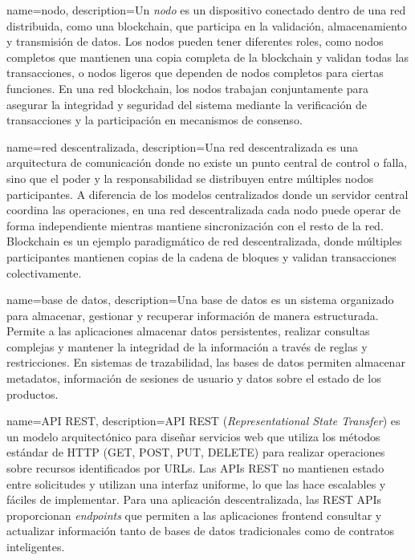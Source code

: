 {
    name=nodo,
    description={Un \textit{nodo} es un dispositivo conectado dentro de una red distribuida, como una blockchain, que participa en la validación, almacenamiento y transmisión de datos. Los nodos pueden tener diferentes roles, como nodos completos que mantienen una copia completa de la blockchain y validan todas las transacciones, o nodos ligeros que dependen de nodos completos para ciertas funciones. En una red blockchain, los nodos trabajan conjuntamente para asegurar la integridad y seguridad del sistema mediante la verificación de transacciones y la participación en mecanismos de consenso.}
}

{
    name=red descentralizada,
    description={Una red descentralizada es una arquitectura de comunicación donde no existe un punto central de control o falla, sino que el poder y la responsabilidad se distribuyen entre múltiples nodos participantes. A diferencia de los modelos centralizados donde un servidor central coordina las operaciones, en una red descentralizada cada nodo puede operar de forma independiente mientras mantiene sincronización con el resto de la red. Blockchain es un ejemplo paradigmático de red descentralizada, donde múltiples participantes mantienen copias de la cadena de bloques y validan transacciones colectivamente.}
}

{
    name=base de datos,
    description={Una base de datos es un sistema organizado para almacenar, gestionar y recuperar información de manera estructurada. Permite a las aplicaciones almacenar datos persistentes, realizar consultas complejas y mantener la integridad de la información a través de reglas y restricciones. En sistemas de trazabilidad, las bases de datos permiten almacenar metadatos, información de sesiones de usuario y datos sobre el estado de los productos.}
}

{
    name=API REST,
    description={API REST (\textit{Representational State Transfer}) es un modelo arquitectónico para diseñar servicios web que utiliza los métodos estándar de HTTP (GET, POST, PUT, DELETE) para realizar operaciones sobre recursos identificados por URLs. Las APIs REST no mantienen estado entre solicitudes y utilizan una interfaz uniforme, lo que las hace escalables y fáciles de implementar. Para una aplicación descentralizada, las REST APIs proporcionan \textit{endpoints} que permiten a las aplicaciones frontend consultar y actualizar información tanto de bases de datos tradicionales como de contratos inteligentes.}
}

